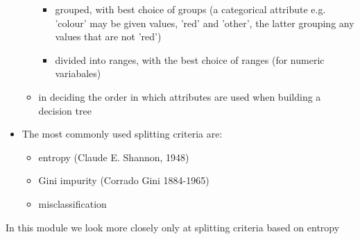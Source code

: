 \begin{itemize}
\begin{itemize}
\begin{itemize}
      \item grouped, with best choice of groups (a categorical attribute e.g. 'colour' may be given values, 'red' and 'other', the latter grouping any values that are not 'red') 
      \item divided into ranges, with the best choice of ranges (for numeric variabales)
      \end{itemize}      
    \item in deciding the order in which attributes are used when building a decision tree
    \end{itemize}
  \item The most commonly used splitting criteria are:
    \begin{itemize}
    \item entropy (Claude E. Shannon, 1948)
    \item Gini impurity (Corrado Gini 1884-1965)
    \item misclassification
    \end{itemize}
  \end{itemize}  

In this module we look more closely only at splitting criteria based on entropy
   
